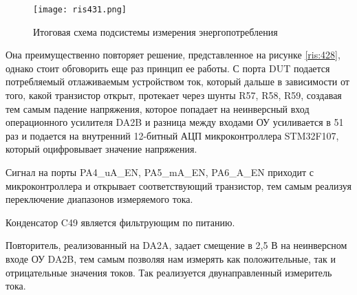 \begin{figure}[H]
\centering
\texttt{[image: ris431.png]}
\caption{Итоговая схема подсистемы измерения энергопотребления}
\label{ris:431}
\end{figure}

Она преимущественно повторяет решение, представленное на рисунке \ref{ris:428}, однако стоит обговорить еще раз 
принцип ее работы. С порта DUT подается потребляемый отлаживаемым устройством ток, который дальше в зависимости 
от того, какой транзистор открыт, протекает через шунты R57, R58, R59, создавая тем самым падение напряжения, 
которое попадает на неинверсный вход операционного усилителя DA2B и разница между входами ОУ усиливается в 51 
раз и подается на внутренний 12-битный АЦП микроконтроллера STM32F107, который оцифровывает значение  напряжения.

Сигнал на порты PA4\_uA\_EN, PA5\_mA\_EN, PA6\_A\_EN приходит с микроконтроллера и открывает соответствующий 
транзистор, тем самым реализуя переключение диапазонов измеряемого тока.

Конденсатор C49 является фильтрующим по питанию. 

Повторитель, реализованный на DA2A, задает смещение в 2,5 В на неинверсном входе ОУ DA2B, тем самым позволяя нам 
измерять как положительные, так и отрицательные значения токов. Так реализуется двунаправленный измеритель тока. 